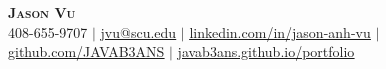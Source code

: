 \begin{center}
    \textbf{\Huge \scshape Jason Vu} \\ \vspace{1pt}
    \small 408-655-9707 $|$ \href{mailto:jvu@scu.edu}{\underline{jvu@scu.edu}} $|$ 
    \href{https://linkedin.com/in/jason-anh-vu}{\underline{linkedin.com/in/jason-anh-vu}} $|$
    \href{https://github.com/javab3ans}{\underline{github.com/JAVAB3ANS}} $|$
    \href{https://javab3ans.github.io/portfolio}{\underline{javab3ans.github.io/portfolio}}
\end{center} 

